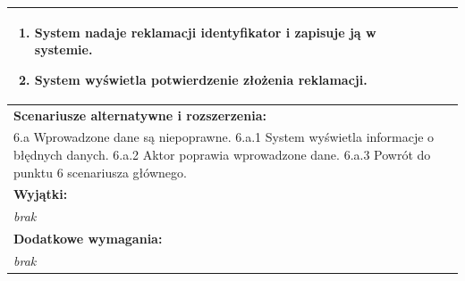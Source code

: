 \begin{center}
\begin{longtable}[h]{|p{1.6cm}|p{13.5cm}|}
{\begin{enumerate}
\item System nadaje reklamacji identyfikator i zapisuje ją w systemie.
\item System wyświetla potwierdzenie złożenia reklamacji.
\end{enumerate}
} \\ \hline
\multicolumn{2}{|p{15.1cm}|}{\textbf{Scenariusze alternatywne i rozszerzenia:}} \\
\multicolumn{2}{|p{15.1cm}|}{
6.a Wprowadzone dane są niepoprawne. \newline
6.a.1 System wyświetla informacje o błędnych danych. \newline
6.a.2 Aktor poprawia wprowadzone dane. \newline
6.a.3 Powrót do punktu 6 scenariusza głównego.
} \\ \hline
\multicolumn{2}{|p{15.1cm}|}{\textbf{Wyjątki:}} \\
\multicolumn{2}{|p{15.1cm}|}{
\textit{brak}
} \\ \hline
\multicolumn{2}{|p{15.1cm}|}{\textbf{Dodatkowe wymagania:}} \\
\multicolumn{2}{|p{15.1cm}|}{
\textit{brak}
} \\
\hline
\end{longtable}
\end{center}

